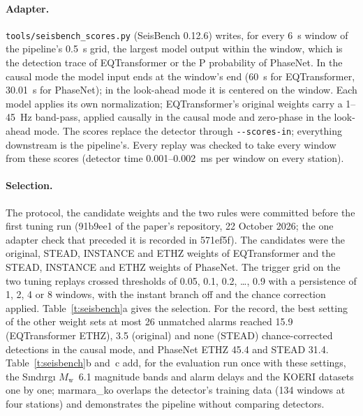 \documentclass[11pt,a4paper]{article}
\newcommand{\Mw}{$M_\mathrm{w}$}
\newcommand{\tool}[1]{\nolinkurl{#1}}
\begin{document}
\paragraph{Adapter.} \tool{tools/seisbench_scores.py} (SeisBench 0.12.6)
writes, for every 6~s window of the pipeline's 0.5~s grid, the largest model
output within the window, which is the detection trace of EQTransformer or the P
probability of PhaseNet. In the causal mode the model input ends at the window's
end (60~s for EQTransformer, 30.01~s for PhaseNet); in the look-ahead mode it is
centered on the window. Each model applies its own normalization;
EQTransformer's original weights carry a 1--45~Hz band-pass, applied causally in
the causal mode and zero-phase in the look-ahead mode. The scores replace the
detector through \tool{--scores-in}; everything downstream is the pipeline's.
Every replay was checked to take every window from these scores (detector time
0.001--0.002~ms per window on every station).

\paragraph{Selection.} The protocol, the candidate weights and the two rules
were committed before the first tuning run (91b9ee1 of the paper's repository,
22 October 2026; the one adapter check that preceded it is recorded in 571ef5f). The candidates were the original, STEAD, INSTANCE and ETHZ weights of EQTransformer and the STEAD, INSTANCE and ETHZ weights of PhaseNet. The trigger grid on the two tuning replays crossed thresholds of 0.05, 0.1, 0.2, \ldots, 0.9 with a persistence of 1, 2, 4 or 8 windows, with the instant branch off and the chance correction applied. Table~\ref{t:seisbench}a gives the selection. For the record,
the best setting of the other weight sets at most 26 unmatched alarms reached
15.9 (EQTransformer ETHZ), 3.5 (original) and none (STEAD) chance-corrected
detections in the causal mode, and PhaseNet ETHZ 45.4 and STEAD 31.4.
Table~\ref{t:seisbench}b and~c add, for the evaluation run once with these
settings, the S\i{}nd\i{}rg\i{} \Mw{}~6.1 magnitude bands and alarm delays and the KOERI
datasets one by one; marmara\_ko overlaps the detector's training data (134 windows
at four stations) and demonstrates the pipeline without comparing detectors.
\end{document}
